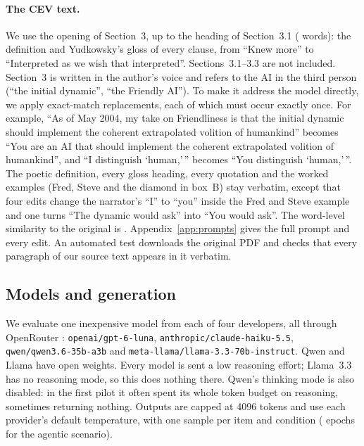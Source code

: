 \paragraph{The CEV text.}
We use the opening of Section~3, up to the heading of Section~3.1 (\RCevVerbatimWords{} words): the definition and
Yudkowsky's gloss of every clause, from ``Knew more'' to ``Interpreted as we wish that interpreted''. Sections~3.1--3.3
are not included. Section~3 is written in the author's voice and refers to
the AI in the third person (``the initial dynamic'', ``the Friendly AI''). To make it address the model directly,
we apply \RCevEdits{} exact-match replacements, each of which must occur exactly once. For example, ``As of May 2004, my take on
Friendliness is that the initial dynamic should implement the coherent extrapolated volition of humankind'' becomes
``You are an AI that should implement the coherent extrapolated volition of humankind'', and ``I distinguish
`human,'\,'' becomes ``You distinguish `human,'\,''. The poetic definition, every gloss heading, every quotation and
the worked examples (Fred, Steve and the diamond in box~B) stay verbatim, except that four edits change the narrator's
``I'' to ``you'' inside the Fred and Steve example and one turns ``The dynamic would ask'' into ``You would ask''. The word-level similarity to the original is
\RCevSimilarity{}. Appendix~\ref{app:prompts} gives the full prompt and every edit. An automated test downloads the
original PDF and checks that every paragraph of our source text appears in it verbatim.

\subsection{Models and generation}
We evaluate one inexpensive model from each of four developers, all through OpenRouter \citep{openrouter}:
\texttt{openai/gpt-6-luna}, \texttt{anthropic/claude-haiku-5.5}, \texttt{qwen/qwen3.6-35b-a3b} and
\texttt{meta-llama/llama-3.3-70b-instruct}. Qwen and Llama have open weights. Every model is sent a low
reasoning effort; Llama~3.3 has no reasoning mode, so this does nothing there. Qwen's thinking mode is also disabled: in the first pilot it often spent its whole token budget on
reasoning, sometimes returning nothing. Outputs are capped at 4096 tokens and use each provider's default
temperature, with one sample per item and condition (\RAmEpochs{} epochs for the agentic scenario).

